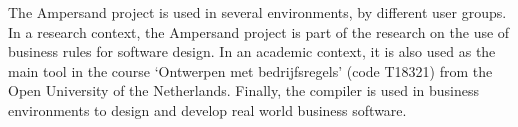 The Ampersand project is used in several environments, by different user groups.
In a research context, the Ampersand project is part of the research on the use of business rules for software design.
In an academic context, it is also used as the main tool in the course `Ontwerpen met bedrijfsregels' (code T18321) from the Open University of the Netherlands.
Finally, the compiler is used in business environments to design and develop real world business software.
